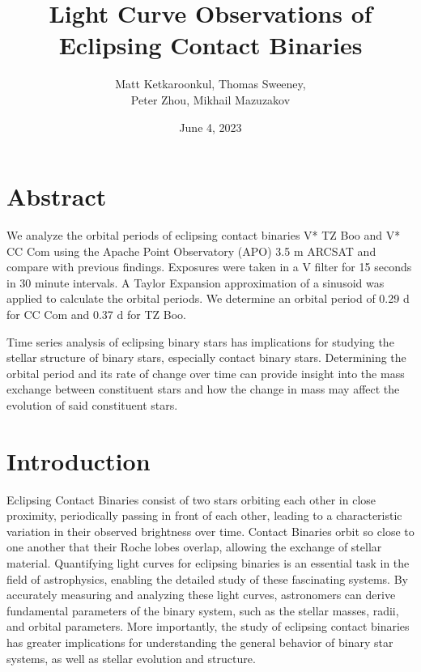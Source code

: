 \documentclass[12pt]{article}
\title{\vspace{-2em} {\bf Light Curve Observations of Eclipsing Contact Binaries}}
\author{Matt Ketkaroonkul, Thomas Sweeney, \\ Peter Zhou, Mikhail Mazuzakov}
\date{June 4, 2023}
\begin{document}
\maketitle

\section{Abstract}

We analyze the orbital periods of eclipsing contact binaries V* TZ Boo and V* CC Com using the Apache Point Observatory (APO) 3.5 m ARCSAT and compare with previous findings. Exposures were taken in a V filter for 15 seconds in 30 minute intervals. A Taylor Expansion approximation of a sinusoid was applied to calculate the orbital periods. We determine an orbital period of 0.29 d for CC Com and 0.37 d for TZ Boo.

Time series analysis of eclipsing binary stars has implications for studying the stellar structure of binary stars, especially contact binary stars. Determining the orbital period and its rate of change over time can provide insight into the mass exchange between constituent stars and how the change in mass may affect the evolution of said constituent stars.

\section{Introduction}

Eclipsing Contact Binaries consist of two stars orbiting each other in close proximity, periodically passing in front of each other, leading to a characteristic variation in their observed brightness over time. Contact Binaries orbit so close to one another that their Roche lobes overlap, allowing the exchange of stellar material. Quantifying light curves for eclipsing binaries is an essential task in the field of astrophysics, enabling the detailed study of these fascinating systems. By accurately measuring and analyzing these light curves, astronomers can derive fundamental parameters of the binary system, such as the stellar masses, radii, and orbital parameters. More importantly, the study of eclipsing contact binaries has greater implications for understanding the general behavior of binary star systems, as well as stellar evolution and structure.
\end{document}
